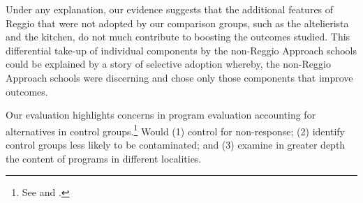 Under any explanation, our evidence suggests that the additional features of Reggio that were not adopted by our comparison groups, such as the altelierista and the kitchen, do not much contribute to boosting the outcomes studied. This differential take-up of individual components by the non-Reggio Approach schools could be explained by a story of selective adoption whereby, the non-Reggio Approach schools were discerning and chose only those components that improve outcomes.

Our evaluation highlights concerns in program evaluation accounting for alternatives in control groups.\footnote{See \cite{Heckman_Hohmann_etal_2000_QJE} and \cite{Kline_Walters_2016_QJE}.} Would (1) control for non-response; (2) identify control groups less likely to be contaminated; and (3) examine in greater depth the content of programs in different localities. 






